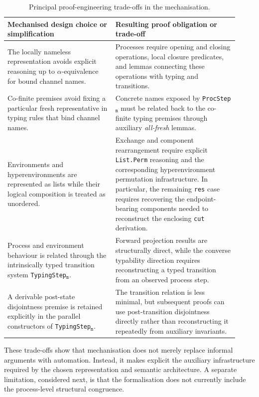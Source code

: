 \begin{table}[t]
\caption{Principal proof-engineering trade-offs in the mechanisation.}\label{tab:proof-engineering-tradeoffs}
\centering
\begin{tabular}{@{}
  >{\raggedright\arraybackslash}p{0.43\linewidth}
  >{\raggedright\arraybackslash}p{0.49\linewidth}
@{}}
\toprule
\textbf{Mechanised design choice or simplification} & \textbf{Resulting proof obligation or trade-off} \\
\midrule
The locally nameless representation avoids explicit reasoning up to $\alpha$-equivalence for bound channel names. & Processes require opening and closing operations, local closure predicates, and lemmas connecting these operations with typing and transitions. \\
\addlinespace
Co-finite premises avoid fixing a particular fresh representative in typing rules that bind channel names. & Concrete names exposed by \texttt{ProcStep}$_{\texttt{m}}$ must be related back to the co-finite typing premises through auxiliary \emph{all-fresh} lemmas. \\
\addlinespace
Environments and hyperenvironments are represented as lists while their logical composition is treated as unordered. & Exchange and component rearrangement require explicit \texttt{List.Perm} reasoning and the corresponding hyperenvironment permutation infrastructure. In particular, the remaining \texttt{res} case requires recovering the endpoint-bearing components needed to reconstruct the enclosing \texttt{cut} derivation. \\
\addlinespace
Process and environment behaviour is related through the intrinsically typed transition system \texttt{TypingStep}$_{\texttt{m}}$. & Forward projection results are structurally direct, while the converse typability direction requires reconstructing a typed transition from an observed process step. \\
\addlinespace
A derivable post-state disjointness premise is retained explicitly in the parallel constructors of \texttt{TypingStep}$_{\texttt{m}}$. & The transition relation is less minimal, but subsequent proofs can use post-transition disjointness directly rather than reconstructing it repeatedly from auxiliary invariants. \\
\bottomrule
\end{tabular}
\end{table}

These trade-offs show that mechanisation does not merely replace informal arguments with automation. Instead, it makes explicit the auxiliary infrastructure required by the chosen representation and semantic architecture. A separate limitation, considered next, is that the formalisation does not currently include the process-level structural congruence.

